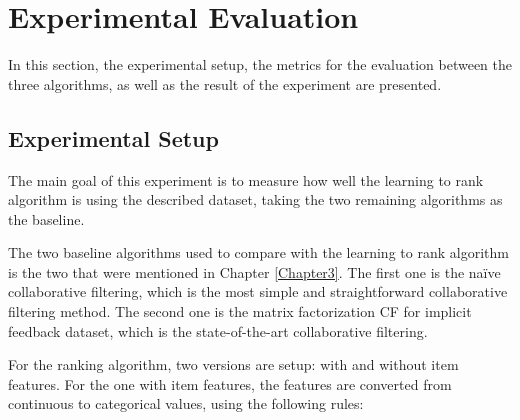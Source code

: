 \chapter{Experimental Evaluation} %

\label{Chapter4}

In this section, the experimental setup, the metrics for the evaluation between the three algorithms, as well as the result of the experiment are presented.

\section{Experimental Setup}
The main goal of this experiment is to measure how well the learning to rank algorithm is using the described dataset, taking the two remaining algorithms as the baseline. 

\noindent The two baseline algorithms used to compare with the learning to rank algorithm is the two that were mentioned in Chapter \ref{Chapter3}. The first one is the na\"ive collaborative filtering, which is the most simple and straightforward collaborative filtering method. The second one is the matrix factorization CF for implicit feedback dataset, which is the state-of-the-art collaborative filtering.

\noindent For the ranking algorithm, two versions are setup: with and without item features. For the one with item features, the features are converted from continuous to categorical values, using the following rules:

